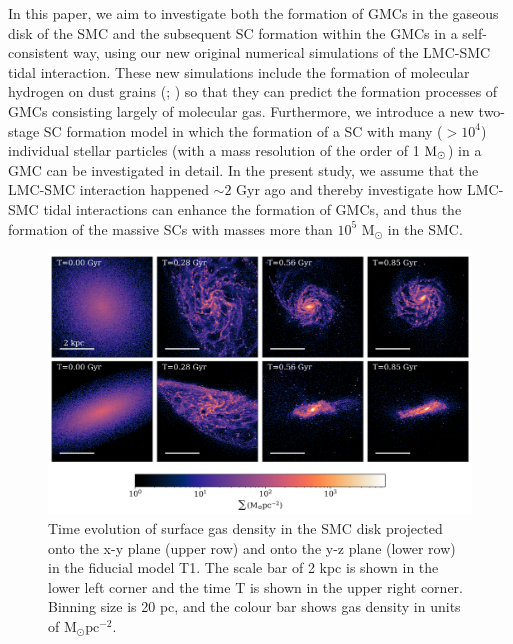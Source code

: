 \documentclass[fleqn,usenatbib]{mnras}
\begin{document}
In this paper, we aim to investigate both the formation of GMCs in the gaseous disk of the SMC and the subsequent SC formation within the GMCs in a self-consistent way, using our new original numerical simulations of the LMC-SMC tidal interaction. These new simulations include the formation of molecular hydrogen on dust grains (\citealt{K5_Bekki2013}; \citealt{K6_Bekki2015}) so that they can predict the formation processes of GMCs consisting largely of molecular gas. Furthermore, we introduce a new two-stage SC formation model in which the formation of a SC with many ($>10^4$) individual stellar particles (with a mass resolution of the order of 1 ${\rm M}_{\odot}$) in a GMC can be investigated in detail. In the present study, we assume that the LMC-SMC interaction happened ${\sim} 2$ Gyr ago and thereby investigate how LMC-SMC tidal interactions can enhance the formation of GMCs, and thus the formation of the massive SCs with masses more than $10^5$ $\text{M}_\odot$ in the SMC.

\begin{figure}
 \centering
 \includegraphics[width=15cm]{1_atually_YZ_projection_.png}
 \caption{Time evolution of surface gas density in the SMC disk projected onto the x-y plane (upper row) and onto the y-z plane (lower row) in the fiducial model T1.
 The scale bar of 2 kpc is shown in the lower left corner and the time T is shown in the upper right corner. Binning size is 20 pc, and the colour bar shows gas density in units of $\text{M}_\odot \text{pc}^{-2}$.}
 \label{fig:1SMCall}
\end{figure}
\end{document}
